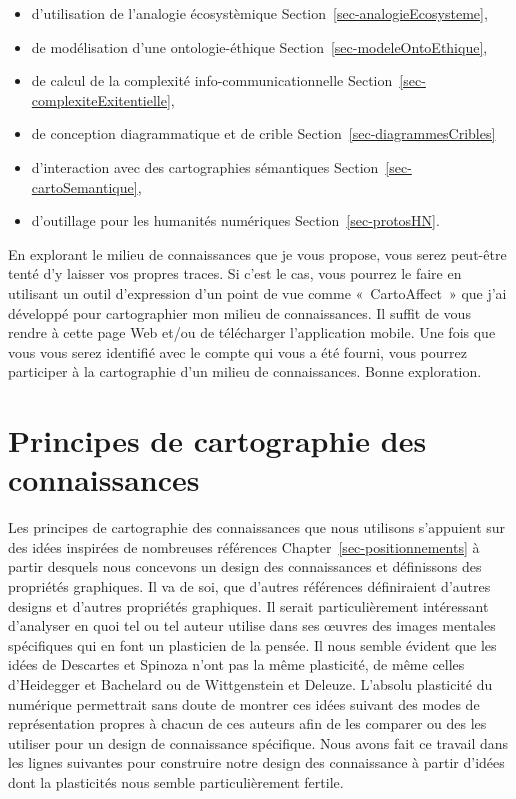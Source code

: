 \documentclass[
  letterpaper,
  DIV=11,
  numbers=noendperiod]{scrreprt}
\providecommand{\tightlist}{%
  \setlength{\itemsep}{0pt}\setlength{\parskip}{0pt}}\usepackage{longtable,booktabs,array}
\begin{document}
\begin{itemize}
\tightlist
\item
  d'utilisation de l'analogie écosystèmique
  Section~\ref{sec-analogieEcosysteme},
\item
  de modélisation d'une ontologie-éthique
  Section~\ref{sec-modeleOntoEthique},
\item
  de calcul de la complexité info-communicationnelle
  Section~\ref{sec-complexiteExitentielle},
\item
  de conception diagrammatique et de crible
  Section~\ref{sec-diagrammesCribles}
\item
  d'interaction avec des cartographies sémantiques
  Section~\ref{sec-cartoSemantique},
\item
  d'outillage pour les humanités numériques Section~\ref{sec-protosHN}.
\end{itemize}

En explorant le milieu de connaissances que je vous propose, vous serez
peut-être tenté d'y laisser vos propres traces. Si c'est le cas, vous
pourrez le faire en utilisant un outil d'expression d'un point de vue
comme «~CartoAffect~» que j'ai développé pour cartographier mon milieu
de connaissances. Il suffit de vous rendre à cette page Web et/ou de
télécharger l'application mobile. Une fois que vous vous serez identifié
avec le compte qui vous a été fourni, vous pourrez participer à la
cartographie d'un milieu de connaissances. Bonne exploration.

\hypertarget{sec-principesCarto}{%
\chapter{Principes de cartographie des
connaissances}\label{sec-principesCarto}}

Les principes de cartographie des connaissances que nous utilisons
s'appuient sur des idées inspirées de nombreuses références
Chapter~\ref{sec-positionnements} à partir desquels nous concevons un
design des connaissances et définissons des propriétés graphiques. Il va
de soi, que d'autres références définiraient d'autres designs et
d'autres propriétés graphiques. Il serait particulièrement intéressant
d'analyser en quoi tel ou tel auteur utilise dans ses œuvres des images
mentales spécifiques qui en font un plasticien de la pensée. Il nous
semble évident que les idées de Descartes et Spinoza n'ont pas la même
plasticité, de même celles d'Heidegger et Bachelard ou de Wittgenstein
et Deleuze. L'absolu plasticité du numérique permettrait sans doute de
montrer ces idées suivant des modes de représentation propres à chacun
de ces auteurs afin de les comparer ou des les utiliser pour un design
de connaissance spécifique. Nous avons fait ce travail dans les lignes
suivantes pour construire notre design des connaissance à partir d'idées
dont la plasticités nous semble particulièrement fertile.
\end{document}
